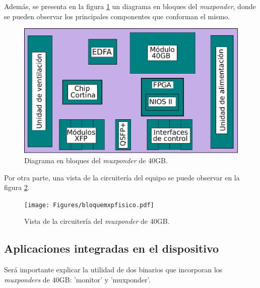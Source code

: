 Además, se presenta en la figura \ref{fig:diagramabloque} un diagrama en bloques del \textit{muxponder}, donde se pueden observar los principales componentes que conforman el mismo.

\begin{figure}[H]
	\centering
	\includegraphics[scale=0.60]{Figures/diagramabloquesmxp.pdf}
	\caption{Diagrama en bloques del \textit{muxponder} de 40GB.}
	\label{fig:diagramabloque}
  \end{figure}

Por otra parte, una vista de la circuitería del equipo se puede observar en la figura \ref{fig:diagramabloquemxp}.

\begin{figure}[H]
	\centering
	\texttt{[image: Figures/bloquemxpfisico.pdf]}
	\caption{Vista de la circuitería del \textit{muxponder} de 40GB.}
	\label{fig:diagramabloquemxp}
  \end{figure}

\subsection{Aplicaciones integradas en el dispositivo}

Será importante explicar la utilidad de dos binarios que incorporan los \textit{muxponders} de 40GB: 'monitor' y 'muxponder'. 

